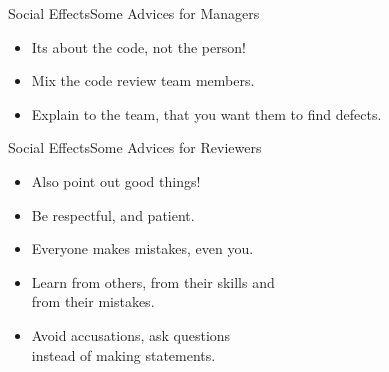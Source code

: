 \begin{Frame}{Social Effects}{Some Advices for Managers}
  \begin{itemize}
    \item Its about the code, not the person!
    \item Mix the code review team members.
    \item Explain to the team, that you \alert{want} them to find defects.
  \end{itemize}
\end{Frame}

\begin{Frame}{Social Effects}{Some Advices for Reviewers}
  \begin{itemize}
    \item Also point out good things!
    \item Be respectful, and patient.
    \item Everyone makes mistakes, even you.
    \item Learn from others, from their skills and\\
      from their mistakes.
    \item Avoid accusations, ask questions\\
      instead of making statements.
  \end{itemize}

  \xxx

\end{Frame}




